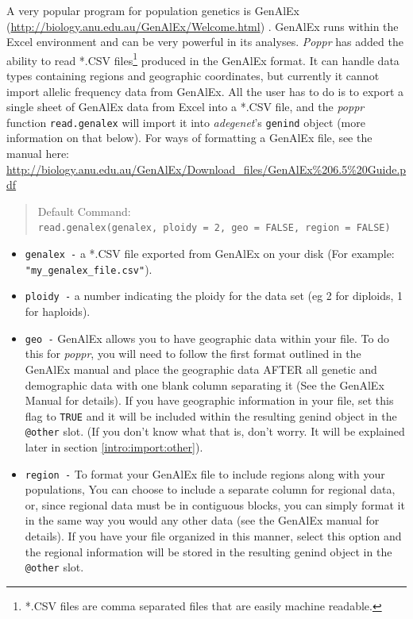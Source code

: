\documentclass[letterpaper]{article}
\newcommand{\tab}{\hspace*{1em}}
\begin{document}
\tab\tab A very popular program for population genetics is GenAlEx (\url{http://biology.anu.edu.au/GenAlEx/Welcome.html}) \cite{Peakall:2012, Peakall:2006}. GenAlEx runs within the Excel environment and can be very powerful in its analyses. \textit{Poppr} has added the ability to read *.CSV files\footnote{*.CSV files are comma separated files that are easily machine readable.} produced in the GenAlEx format. It can handle data types containing regions and geographic coordinates, but currently it cannot import allelic frequency data from GenAlEx. All the user has to do is to export a single sheet of GenAlEx data from Excel into a *.CSV file, and the \textit{poppr} function \texttt{read.genalex} will import it into \textit{adegenet}'s \texttt{genind} object (more information on that below). For ways of formatting a GenAlEx file, see the manual here: \url{http://biology.anu.edu.au/GenAlEx/Download_files/GenAlEx\%206.5\%20Guide.pdf}
\begin{quote}
Default Command:\\
\texttt{read.genalex(genalex, ploidy = 2, geo = FALSE, region = FALSE)}
\end{quote}
\begin{itemize}
  \item \texttt{genalex -} a *.CSV file exported from GenAlEx on your disk (For example: \texttt{"my\_genalex\_file.csv"}).
  \item \texttt{ploidy -} a number indicating the ploidy for the data set (eg 2 for diploids, 1 for haploids).
  \item \texttt{geo -} GenAlEx allows you to have geographic data within your file. To do this for \textit{poppr}, you will need to follow the first format outlined in the GenAlEx manual and place the geographic data AFTER all genetic and demographic data with one blank column separating it (See the GenAlEx Manual for details). If you have geographic information in your file, set this flag to \texttt{TRUE} and it will be included within the resulting genind object in the \texttt{@other} slot. (If you don't know what that is, don't worry. It will be explained later in section \ref{intro:import:other}).
  \item \texttt{region -} To format your GenAlEx file to include regions along with your populations, You can choose to include a separate column for regional data, or, since regional data must be in contiguous blocks, you can simply format it in the same way you would any other data (see the GenAlEx manual for details). If you have your file organized in this manner, select this option and the regional information will be stored in the resulting genind object in the \texttt{@other} slot.
\end{itemize}
\end{document}
